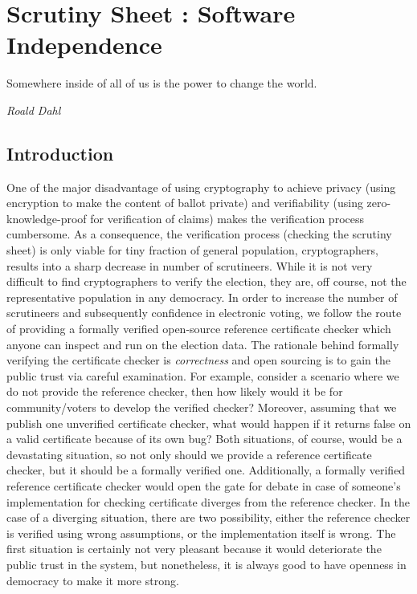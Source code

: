 \chapter{Scrutiny Sheet : Software Independence}
\label{cha:software_independence}
\setlength{\parindent}{2em}

\epigraph{Somewhere inside of all of us is the power to change the world.} 
{\textit{Roald Dahl }}

\section{Introduction}


One of the major disadvantage of using cryptography 
to achieve privacy (using encryption to make the 
content of ballot private)  and verifiability (using zero-knowledge-proof for verification of claims) makes the verification 
process cumbersome. As a consequence, the verification process (checking the scrutiny sheet) is only viable for
tiny fraction of general population, cryptographers, results into a sharp decrease in number of scrutineers. 
While it is not very difficult to find cryptographers to verify the election, 
they are, off course, not the representative population in any democracy. 
In order to increase the number of scrutineers and subsequently confidence in electronic voting, we follow the 
route of providing a formally verified open-source 
reference certificate checker which anyone can inspect and run on the election data. 
  The rationale behind formally verifying the certificate checker is \emph{correctness}
  and open sourcing is to gain the public trust  via careful examination.  
  For example, consider a scenario where we do not provide the reference checker,
  then how 
  likely would it be for community/voters to develop the 
  verified checker? Moreover, assuming that we publish one unverified certificate checker,
  what would happen if it returns false on a valid certificate because of its own bug? 
  Both situations, of course, would be a devastating situation, so not only 
  should we provide a reference certificate checker, but it should be a formally verified one. 
  Additionally, a formally verified reference certificate checker would open the gate for
  debate in case of someone's implementation for checking certificate diverges from the reference checker.
In the case of a diverging situation, there are two possibility, either the reference checker is verified 
using wrong assumptions,  or the implementation itself is wrong.  The first situation is certainly 
not very pleasant because it would deteriorate the public trust in the system, but nonetheless, it is always
good to  have openness in democracy to make it more strong. 
 


